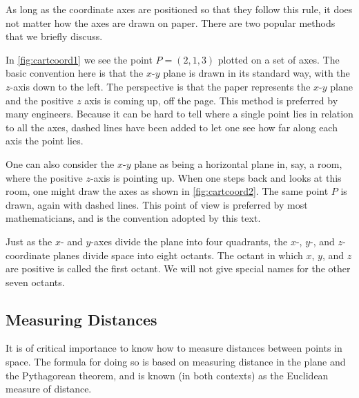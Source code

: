 As long as the coordinate axes are positioned so that they follow this rule, it does not matter how the axes are drawn on paper. There are two popular methods that we briefly discuss.

In \autoref{fig:cartcoord1} we see the point $P=(2,1,3)$ plotted on a set of axes. The basic convention here is that the $x$-$y$ plane is drawn in its standard way, with the $z$-axis down to the left. The perspective  is that the paper represents the $x$-$y$ plane and the positive $z$ axis is coming up, off the page. This method is preferred by many engineers. Because it can be hard to tell where a single point lies in relation to all the axes, dashed lines have been added to let one see how far along each axis the point lies.

One can also consider the $x$-$y$ plane as being a horizontal plane in, say, a room, where the positive $z$-axis is pointing up. When one steps back and looks at this room, one might draw the axes as shown in \autoref{fig:cartcoord2}. The same point $P$ is drawn, again with dashed lines. This point of view is preferred by most mathematicians, and is the convention adopted by this text.

Just as the $x$- and $y$-axes divide the plane into four quadrants, the $x$-, $y$-, and $z$-coordinate planes divide space into eight octants.  The octant in which $x$, $y$, and $z$ are positive is called the first octant.  We will not give special names for the other seven octants.

\subsection{Measuring Distances}
It is of critical importance to know how to measure distances between points in space. The formula for doing so is based on measuring distance in the plane and the Pythagorean theorem, and is known (in both contexts) as the Euclidean measure of distance.

